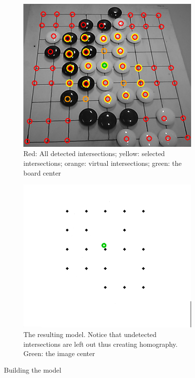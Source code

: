 	\begin{figure}
		\begin{subfigure}{0.45\textwidth}
			\includegraphics[width=\textwidth]{images/buildingModel.png}
			\caption{Red: All detected intersections; yellow: selected intersections; orange: virtual intersections; green: the board center}
			\label{fig:buildModel-input}
		\end{subfigure}
		\hfill
		\begin{subfigure}{0.45\textwidth}
			\includegraphics[width=\textwidth]{images/builtModel.png}
			\caption{The resulting model. Notice that undetected intersections are left out thus creating homography. Green: the image center}
			\label{fig:buildModel-output}
		\end{subfigure}
		\caption{Building the model}
		\label{fig:buildModel}
	\end{figure}


